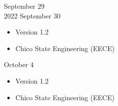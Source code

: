 \documentclass[10pt, letterpaper]{article}
\begin{document}
 September 29\\
2022 September 30
\vspace{-5 pt}
\begin{itemize}
	\item Version 1.2
	\vspace{-10 pt}
	\item Chico State Engineering (EECE)
\end{itemize}

 October 4
\vspace{-5 pt}
\begin{itemize}
	\item Version 1.2
	\vspace{-10 pt}
	\item Chico State Engineering (EECE)
\end{itemize}
\end{document}
